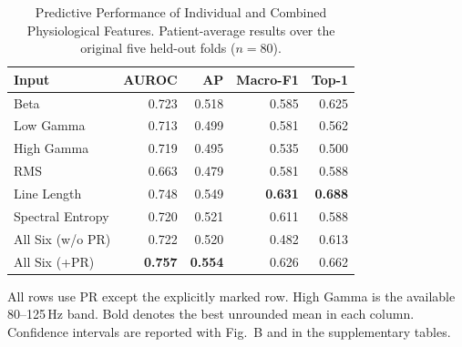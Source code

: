 \begin{table}[t]
\centering
\caption{Predictive Performance of Individual and Combined Physiological Features. Patient-average results over the original five held-out folds ($n=80$).}
\label{tab:physiological-prediction}
\scriptsize
\setlength{\tabcolsep}{2pt}
\begin{tabular*}{\columnwidth}{@{\extracolsep{\fill}}lrrrr@{}}
\toprule
Input & AUROC & AP & Macro-F1 & Top-1 \\
\midrule
Beta & 0.723 & 0.518 & 0.585 & 0.625 \\
Low Gamma & 0.713 & 0.499 & 0.581 & 0.562 \\
High Gamma & 0.719 & 0.495 & 0.535 & 0.500 \\
RMS & 0.663 & 0.479 & 0.581 & 0.588 \\
Line Length & 0.748 & 0.549 & \textbf{0.631} & \textbf{0.688} \\
Spectral Entropy & 0.720 & 0.521 & 0.611 & 0.588 \\
All Six (w/o PR) & 0.722 & 0.520 & 0.482 & 0.613 \\
All Six (+PR) & \textbf{0.757} & \textbf{0.554} & 0.626 & 0.662 \\
\bottomrule
\end{tabular*}
\par\vspace{2pt}
\parbox{\columnwidth}{\scriptsize All rows use PR except the explicitly marked row. High Gamma is the available 80--125\,Hz band. Bold denotes the best unrounded mean in each column. Confidence intervals are reported with Fig.~B and in the supplementary tables.}
\end{table}
